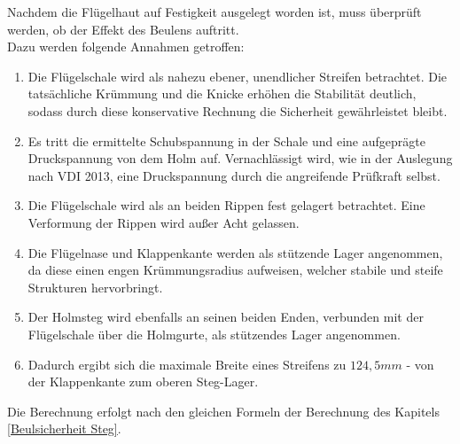 Nachdem die Flügelhaut auf Festigkeit ausgelegt worden ist, muss überprüft werden, ob der Effekt des Beulens auftritt.\\

\noindent Dazu werden folgende Annahmen getroffen:

\begin{enumerate}
	\item Die Flügelschale wird als nahezu ebener, unendlicher Streifen betrachtet. Die tatsächliche Krümmung und die Knicke erhöhen die Stabilität deutlich, sodass durch diese konservative Rechnung die Sicherheit gewährleistet bleibt.
	\item Es tritt die ermittelte Schubspannung in der Schale und eine aufgeprägte Druckspannung von dem Holm auf. Vernachlässigt wird, wie in der Auslegung nach  VDI 2013, eine Druckspannung durch die angreifende Prüfkraft selbst.
	\item Die Flügelschale wird als an beiden Rippen fest gelagert betrachtet. Eine Verformung der Rippen wird außer Acht gelassen.
	\item Die Flügelnase und Klappenkante werden als stützende Lager angenommen, da diese einen engen Krümmungsradius aufweisen, welcher stabile und steife Strukturen hervorbringt.
	\item Der Holmsteg wird ebenfalls an seinen beiden Enden, verbunden mit der Flügelschale über die Holmgurte, als stützendes Lager angenommen.
	\item Dadurch ergibt sich die maximale Breite eines Streifens zu $124,5 mm$ - von der Klappenkante zum oberen Steg-Lager.
\end{enumerate}

\noindent Die Berechnung erfolgt nach den gleichen Formeln der Berechnung des Kapitels \ref{Beulsicherheit Steg}. \\

